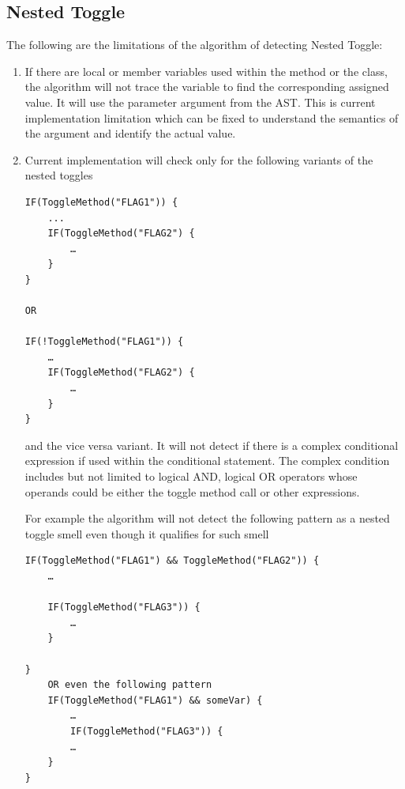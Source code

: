 \documentclass[conference]{IEEEtran}
\begin{document}
\subsection{Nested Toggle}
The following are the limitations of the algorithm of detecting Nested Toggle:
\begin{enumerate}
\item{If there are local or member variables used within the method or the class, the algorithm will not trace the variable to find the corresponding assigned value. It will use the parameter argument from the AST. This is current implementation limitation which can be fixed to understand the semantics of the argument and identify the actual value.}
\item{Current implementation will check only for the following variants of the nested toggles

\begin{lstlisting}
IF(ToggleMethod("FLAG1")) {
	...
	IF(ToggleMethod("FLAG2") {
		…
	}
}

OR

IF(!ToggleMethod("FLAG1")) {
	…
	IF(ToggleMethod("FLAG2") {
		…
	}
}\end{lstlisting}

and the vice versa variant. It will not detect if there is a complex conditional expression if used within the conditional statement. The complex condition includes but not limited to logical AND, logical OR operators whose operands could be either the toggle method call or other expressions. 

For example the algorithm will not detect the following pattern as a nested toggle smell even though it qualifies for such smell
\begin{lstlisting}
IF(ToggleMethod("FLAG1") && ToggleMethod("FLAG2")) {
	…

	IF(ToggleMethod("FLAG3")) {
		…
	}

}	
	OR even the following pattern
	IF(ToggleMethod("FLAG1") && someVar) {
		…
		IF(ToggleMethod("FLAG3")) {
		…
	}
}
\end{lstlisting}
}
\end{enumerate}
\end{document}

